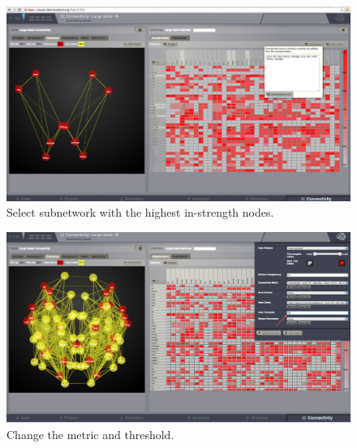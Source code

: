 \documentclass{tufte-handout}
\begin{document}
\begin{figure}[h]
  \includegraphics[width=0.9\linewidth]{Handout_UI_ModellingStructuralLesions_SelectSubnetwork}%
  \caption{Select subnetwork with the highest in-strength nodes.}%
  \label{fig:step_subnetwork}%
\end{figure}
\newpage


\begin{figure}[h]
  \includegraphics[width=0.9\linewidth]{Handout_UI_ModellingStructuralLesions_ChangeNodeColourThreshold}%
  \caption{Change the metric and threshold.}%
  \label{fig:step_change_threshold}%
\end{figure}
\newpage
\end{document}
